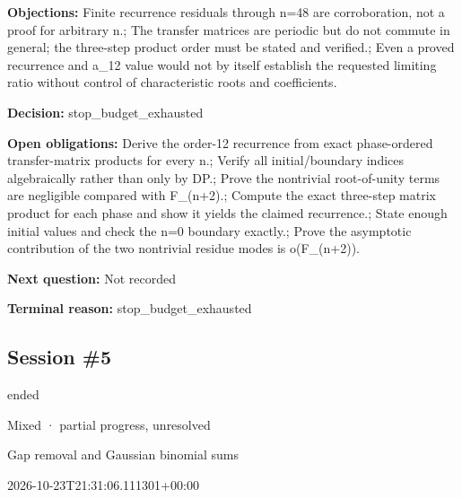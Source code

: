 \documentclass[11pt]{article}
\begin{document}
\textbf{Objections:} Finite recurrence residuals through n=48 are corroboration, not a proof for arbitrary n.; The transfer matrices are periodic but do not commute in general; the three-step product order must be stated and verified.; Even a proved recurrence and a\_12 value would not by itself establish the requested limiting ratio without control of characteristic roots and coefficients.\par
\textbf{Decision:} stop\_budget\_exhausted\par
\textbf{Open obligations:} Derive the order-12 recurrence from exact phase-ordered transfer-matrix products for every n.; Verify all initial/boundary indices algebraically rather than only by DP.; Prove the nontrivial root-of-unity terms are negligible compared with F\_(n+2).; Compute the exact three-step matrix product for each phase and show it yields the claimed recurrence.; State enough initial values and check the n=0 boundary exactly.; Prove the asymptotic contribution of the two nontrivial residue modes is o(F\_(n+2)).\par
\textbf{Next question:} Not recorded\par
\textbf{Terminal reason:} stop\_budget\_exhausted\par
\subsection{Session \#5}
\begin{description}[style=nextline,font=\normalfont\bfseries,leftmargin=0pt,labelsep=0pt]
\item[Execution status] ended
\item[Outcome] Mixed · partial progress, unresolved
\item[Strategy] Gap removal and Gaussian binomial sums
\item[Started] 2026-10-23T21:31:06.111301+00:00
\end{description}
\end{document}
